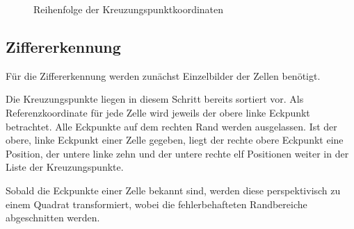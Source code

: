 \begin{figure}[H]
    \hfill
    \caption{Reihenfolge der Kreuzungspunktkoordinaten}
\end{figure}


\subsection{Ziffererkennung}
Für die Ziffererkennung werden zunächst Einzelbilder der Zellen benötigt.

Die Kreuzungspunkte liegen in diesem Schritt bereits sortiert vor.
Als Referenzkoordinate für jede Zelle wird jeweils der obere linke Eckpunkt betrachtet.
Alle Eckpunkte auf dem rechten Rand werden ausgelassen.
Ist der obere, linke Eckpunkt einer Zelle gegeben, liegt der rechte obere Eckpunkt eine Position, der untere linke zehn und der untere rechte elf Positionen weiter in der Liste der Kreuzungspunkte.

Sobald die Eckpunkte einer Zelle bekannt sind, werden diese perspektivisch zu einem Quadrat transformiert, wobei die fehlerbehafteten Randbereiche abgeschnitten werden.

